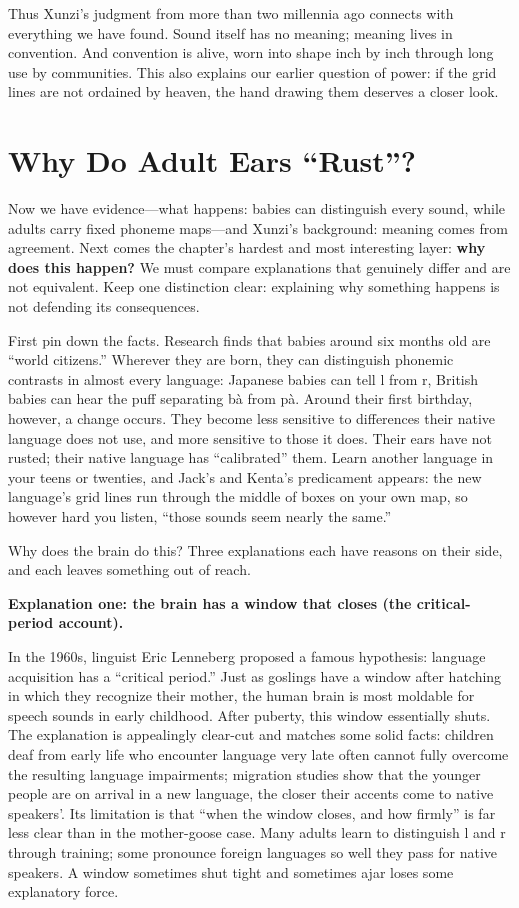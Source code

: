 Thus Xunzi's judgment from more than two millennia ago connects with everything we have found. Sound itself has no meaning; meaning lives in convention. And convention is alive, worn into shape inch by inch through long use by communities. This also explains our earlier question of power: if the grid lines are not ordained by heaven, the hand drawing them deserves a closer look.

\section{Why Do Adult Ears ``Rust''?}
Now we have evidence---what happens: babies can distinguish every sound, while adults carry fixed phoneme maps---and Xunzi's background: meaning comes from agreement. Next comes the chapter's hardest and most interesting layer: \textbf{why does this happen?} We must compare explanations that genuinely differ and are not equivalent. Keep one distinction clear: explaining why something happens is not defending its consequences.

First pin down the facts. Research finds that babies around six months old are ``world citizens.'' Wherever they are born, they can distinguish phonemic contrasts in almost every language: Japanese babies can tell l from r, British babies can hear the puff separating bà from pà. Around their first birthday, however, a change occurs. They become less sensitive to differences their native language does not use, and more sensitive to those it does. Their ears have not rusted; their native language has ``calibrated'' them. Learn another language in your teens or twenties, and Jack's and Kenta's predicament appears: the new language's grid lines run through the middle of boxes on your own map, so however hard you listen, ``those sounds seem nearly the same.''

Why does the brain do this? Three explanations each have reasons on their side, and each leaves something out of reach.

\textbf{Explanation one: the brain has a window that closes (the critical-period account).}

In the 1960s, linguist Eric Lenneberg proposed a famous hypothesis: language acquisition has a ``critical period.'' Just as goslings have a window after hatching in which they recognize their mother, the human brain is most moldable for speech sounds in early childhood. After puberty, this window essentially shuts. The explanation is appealingly clear-cut and matches some solid facts: children deaf from early life who encounter language very late often cannot fully overcome the resulting language impairments; migration studies show that the younger people are on arrival in a new language, the closer their accents come to native speakers'. Its limitation is that ``when the window closes, and how firmly'' is far less clear than in the mother-goose case. Many adults learn to distinguish l and r through training; some pronounce foreign languages so well they pass for native speakers. A window sometimes shut tight and sometimes ajar loses some explanatory force.

